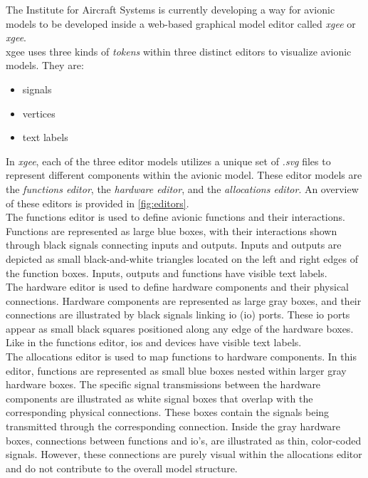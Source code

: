 The Institute for Aircraft Systems is currently developing a way for avionic models to be developed inside a web-based graphical model editor called \textit{\acrlong{xgee}} or \textit{\acrshort{xgee}}.\\
\acrshort{xgee} uses three kinds of \textit{tokens} within three distinct editors to visualize avionic models. They are:
\begin{itemize}
    \item signals
    \item vertices
    \item text labels
\end{itemize}
In \textit{\acrshort{xgee}}, each of the three editor models utilizes a unique set of \textit{.svg} files to represent different components within the avionic model. These editor models are the \textit{functions editor}, the \textit{hardware editor}, and the \textit{allocations editor}. An overview of these editors is provided in \autoref{fig:editors}.\\
The functions editor is used to define avionic functions and their interactions. Functions are represented as large blue boxes, with their interactions shown through black signals connecting inputs and outputs. Inputs and outputs are depicted as small black-and-white triangles located on the left and right edges of the function boxes. Inputs, outputs and functions have visible text labels.\\
The hardware editor is used to define hardware components and their physical connections. Hardware components are represented as large gray boxes, and their connections are illustrated by black signals linking \acrlong{io} (\acrshort{io}) ports. These \acrshort{io} ports appear as small black squares positioned along any edge of the hardware boxes. Like in the functions editor, \acrshort{io}s and devices have visible text labels.\\
The allocations editor is used to map functions to hardware components. In this editor, functions are represented as small blue boxes nested within larger gray hardware boxes. The specific signal transmissions between the hardware components are illustrated as white signal boxes that overlap with the corresponding physical connections. These boxes contain the signals being transmitted through the corresponding connection. Inside the gray hardware boxes, connections between functions and \acrshort{io}'s, are illustrated as thin, color-coded signals. However, these connections are purely visual within the allocations editor and do not contribute to the overall model structure.

